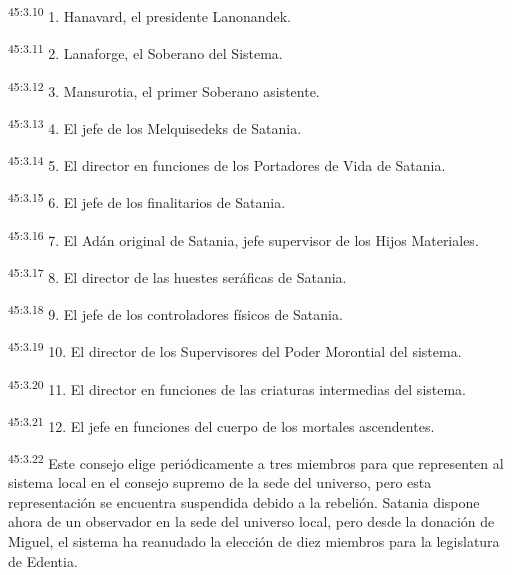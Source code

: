 \par
\textsuperscript{45:3.10} 1. Hanavard, el presidente Lanonandek.

\par
\textsuperscript{45:3.11} 2. Lanaforge, el Soberano del Sistema.

\par
\textsuperscript{45:3.12} 3. Mansurotia, el primer Soberano asistente.

\par
\textsuperscript{45:3.13} 4. El jefe de los Melquisedeks de Satania.

\par
\textsuperscript{45:3.14} 5. El director en funciones de los Portadores de Vida de Satania.

\par
\textsuperscript{45:3.15} 6. El jefe de los finalitarios de Satania.

\par
\textsuperscript{45:3.16} 7. El Adán original de Satania, jefe supervisor de los Hijos Materiales.

\par
\textsuperscript{45:3.17} 8. El director de las huestes seráficas de Satania.

\par
\textsuperscript{45:3.18} 9. El jefe de los controladores físicos de Satania.

\par
\textsuperscript{45:3.19} 10. El director de los Supervisores del Poder Morontial del sistema.

\par
\textsuperscript{45:3.20} 11. El director en funciones de las criaturas intermedias del sistema.

\par
\textsuperscript{45:3.21} 12. El jefe en funciones del cuerpo de los mortales ascendentes.

\par
\textsuperscript{45:3.22} Este consejo elige periódicamente a tres miembros para que representen al sistema local en el consejo supremo de la sede del universo, pero esta representación se encuentra suspendida debido a la rebelión. Satania dispone ahora de un observador en la sede del universo local, pero desde la donación de Miguel, el sistema ha reanudado la elección de diez miembros para la legislatura de Edentia.

